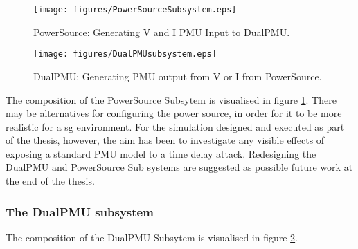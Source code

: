  \begin{figure}
\texttt{[image: figures/PowerSourceSubsystem.eps]}
\caption[PowerSource SIMULINK subsystem]{PowerSource: Generating  V and I PMU Input to DualPMU.}
\label{fig:PowerSource}
\end{figure}
  \begin{figure}
\texttt{[image: figures/DualPMUsubsystem.eps]}
\caption[DualPMU SIMULINK subsystem]{DualPMU: Generating PMU output from V or I from PowerSource.}
\label{fig:DualPMU}
\end{figure}
The composition of the PowerSource Subsytem is visualised in figure \ref{fig:PowerSource}.
There may be alternatives for configuring the power source, in order for it to be more realistic for a \acrlong{sg} environment.
For the simulation designed and executed as part of the thesis, however, the aim has been to investigate any visible effects of exposing a standard PMU model to a time delay attack. Redesigning the DualPMU and PowerSource Sub systems are suggested as possible future work at the end of the thesis.
\subsubsection{The DualPMU subsystem}
The composition of the DualPMU Subsytem is visualised in figure \ref{fig:DualPMU}. 

